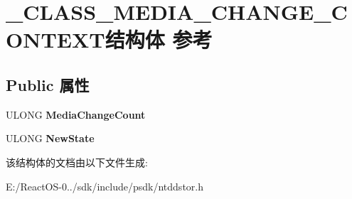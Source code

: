 \hypertarget{struct___c_l_a_s_s___m_e_d_i_a___c_h_a_n_g_e___c_o_n_t_e_x_t}{}\section{\+\_\+\+C\+L\+A\+S\+S\+\_\+\+M\+E\+D\+I\+A\+\_\+\+C\+H\+A\+N\+G\+E\+\_\+\+C\+O\+N\+T\+E\+X\+T结构体 参考}
\label{struct___c_l_a_s_s___m_e_d_i_a___c_h_a_n_g_e___c_o_n_t_e_x_t}
\subsection*{Public 属性}
\begin{DoxyCompactItemize}
\item 
\mbox{\label{struct___c_l_a_s_s___m_e_d_i_a___c_h_a_n_g_e___c_o_n_t_e_x_t_a0742ad15906d4fae6eb88a768a1fab81}} 
U\+L\+O\+NG {\bfseries Media\+Change\+Count}
\item 
\mbox{\label{struct___c_l_a_s_s___m_e_d_i_a___c_h_a_n_g_e___c_o_n_t_e_x_t_acf38fb1b6e4bb8af61004aee20986796}} 
U\+L\+O\+NG {\bfseries New\+State}
\end{DoxyCompactItemize}


该结构体的文档由以下文件生成\+:\begin{DoxyCompactItemize}
\item 
E\+:/\+React\+O\+S-\/0../sdk/include/psdk/ntddstor.\+h\end{DoxyCompactItemize}
